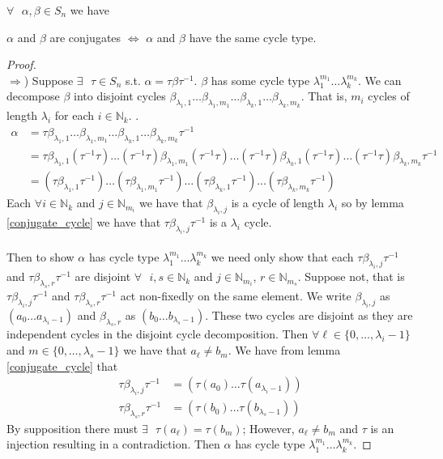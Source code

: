 \begin{theorem}
  \label{conjugate_cycle_type}
  $\forall\text{ }\alpha, \beta \in S_n$ we have
  \begin{center}
    $\alpha$ and $\beta$ are conjugates $\iff$ $\alpha$ and $\beta$
    have the same cycle type.
  \end{center}
\end{theorem}
\begin{proof}
\text{}\\$\Rightarrow$) Suppose $\exists\text{ }\tau\in S_n$ s.t.
$\alpha = \tau\beta\tau^{-1}$. $\beta$ has some cycle type
$\lambda_1^{m_1}\dots\lambda_k^{m_k}$. We can decompose
$\beta$ into disjoint cycles $\beta_{\lambda_1,
1}\dots\beta_{\lambda_1, m_1}\dots\beta_{\lambda_k,
1}\dots\beta_{\lambda_k, m_k}$. That is, $m_i$ cycles of length
$\lambda_i$ for each $i \in \mathbb{N}_k$. .
\begin{align*}
  \alpha & = \tau\beta_{\lambda_1, 1}\dots\beta_{\lambda_1,
  m_1}\dots\beta_{\lambda_k, 1}\dots\beta_{\lambda_k, m_k}\tau^{-1}
  \\
  & = \tau\beta_{\lambda_1,
  1}(\tau^{-1}\tau)\dots(\tau^{-1}\tau)\beta_{\lambda_1,
  m_1}(\tau^{-1}\tau)\dots(\tau^{-1}\tau)\beta_{\lambda_k,
  1}(\tau^{-1}\tau)\dots(\tau^{-1}\tau)\beta_{\lambda_k, m_k}\tau^{-1}      \\
  & = (\tau\beta_{\lambda_1, 1}\tau^{-1})\dots(\tau\beta_{\lambda_1,
  m_1}\tau^{-1})\dots(\tau\beta_{\lambda_k,
  1}\tau^{-1})\dots(\tau\beta_{\lambda_k, m_k}\tau^{-1})
\end{align*}
Each $\forall i \in \mathbb{N}_k$ and $j \in \mathbb{N}_{m_i}$ we
have that $\beta_{\lambda_i, j}$ is a cycle of length $\lambda_i$ so
by lemma \ref{conjugate_cycle} we have that $\tau\beta_{\lambda_i,
j}\tau^{-1}$ is a $\lambda_i$ cycle.
\\\\Then to show $\alpha$ has cycle type
$\lambda_1^{m_1}\dots\lambda_k^{m_k}$ we need only show that each
$\tau\beta_{\lambda_i, j}\tau^{-1}$ and $\tau\beta_{\lambda_s,
r}\tau^{-1}$ are disjoint $\forall\text{ }i, s\in\mathbb{N}_k$ and
$j\in\mathbb{N}_{m_i}$, $r\in\mathbb{N}_{m_s}$. Suppose not, that is
$\tau\beta_{\lambda_i, j}\tau^{-1}$ and $\tau\beta_{\lambda_s,
r}\tau^{-1}$ act non-fixedly on the same element. We write
$\beta_{\lambda_i, j}$ as $(a_0\dots a_{\lambda_i-1})$ and
$\beta_{\lambda_s, r}$ as $(b_0\dots b_{\lambda_s-1})$. These two
cycles are disjoint as they are independent cycles in the disjoint
cycle decomposition. Then $\forall\text{
}\ell\in\{0,\dots,\lambda_i-1\}$ and $m\in\{0,\dots,\lambda_s-1\}$ we
have that $a_\ell \ne b_m$.
We have from lemma \ref{conjugate_cycle} that
\begin{align*}
  \tau\beta_{\lambda_i, j}\tau^{-1} & = (\tau(a_0)\dots\tau(a_{\lambda_i-1})) \\
  \tau\beta_{\lambda_s, r}\tau^{-1} & = (\tau(b_0)\dots\tau(b_{\lambda_s-1}))
\end{align*}
By supposition there must $\exists\text{ }\tau(a_\ell) = \tau(b_m)$;
However, $a_\ell \ne b_m$ and $\tau$ is an injection resulting in a
contradiction. Then $\alpha$ has cycle type
$\lambda_1^{m_1}\dots\lambda_k^{m_k}$.


\end{proof}
